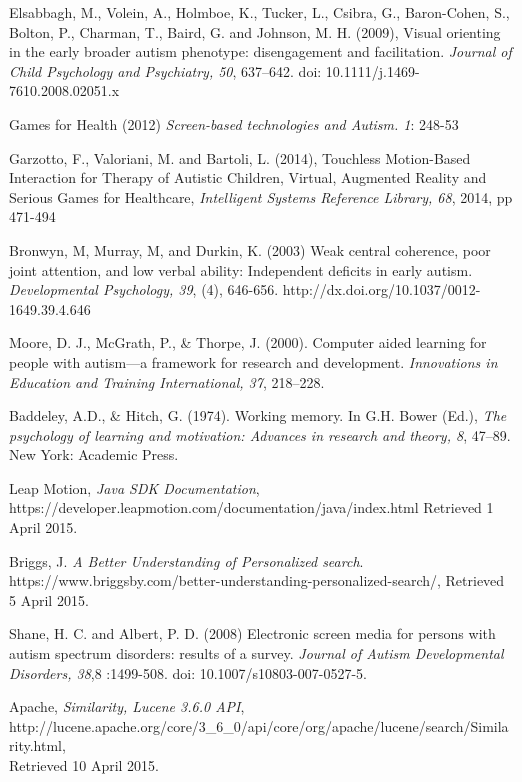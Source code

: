 \documentclass[a4paper, 10pt]{article}
\begin{document}
\begin{thebibliography}{100}
Elsabbagh, M., Volein, A., Holmboe, K., Tucker, L., Csibra, G., Baron-Cohen, S., Bolton, P., Charman, T., Baird, G. and Johnson, M. H. (2009), Visual orienting in the early broader autism phenotype: disengagement and facilitation. \textit{Journal of Child Psychology and Psychiatry, 50}, 637–642. doi: 10.1111/j.1469-7610.2008.02051.x

 Games for Health (2012) \textit{Screen-based technologies and Autism. 1}: 248-53

 Garzotto, F., Valoriani, M. and Bartoli, L. (2014), Touchless Motion-Based Interaction for Therapy of Autistic Children, Virtual, Augmented Reality and Serious Games for Healthcare, \textit{Intelligent Systems Reference Library, 68}, 2014, pp 471-494

 Bronwyn, M, Murray, M, and Durkin, K. (2003) Weak central coherence, poor joint attention, and low verbal ability: Independent deficits in early autism. \textit{Developmental Psychology, 39}, (4), 646-656. http://dx.doi.org/10.1037/0012-1649.39.4.646

Moore, D. J., McGrath, P., \& Thorpe, J. (2000). Computer aided learning for people with autism—a framework for research and development. \textit{Innovations in Education and Training International, 37}, 218–228.

Baddeley, A.D., \& Hitch, G. (1974). Working memory. In G.H. Bower (Ed.), \textit{The psychology of learning and motivation: Advances in research and theory, 8}, 47–89. New York: Academic Press.

 Leap Motion, \textit{Java SDK Documentation}, \\https://developer.leapmotion.com/documentation/java/index.html Retrieved 1 April 2015.

Briggs, J. \textit{A Better Understanding of Personalized search}. https://www.briggsby.com/better-understanding-personalized-search/, Retrieved 5 April 2015.

Shane, H. C. and Albert, P. D. (2008) Electronic screen media for persons with autism spectrum disorders: results of a survey. \textit{Journal of Autism Developmental Disorders, 38},8 :1499-508. doi: 10.1007/s10803-007-0527-5.

 Apache, \textit{Similarity, Lucene 3.6.0 API},  \\http://lucene.apache.org/core/3\_6\_0/api/core/org/apache/lucene/search/Similarity.html, \\Retrieved 10 April 2015.


\end{thebibliography}
\end{document}
